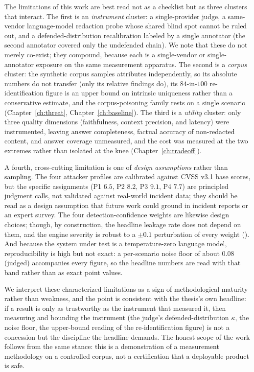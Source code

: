 \documentclass[12pt,a4paper]{report}
\begin{document}
The limitations of this work are best read not as a checklist but as three clusters that
interact. The first is an \emph{instrument} cluster: a single-provider judge, a same-vendor
language-model redaction probe whose shared blind spot cannot be ruled out, and a
defended-distribution recalibration labeled by a single annotator (the second annotator
covered only the undefended chain). We note that these do
not merely co-exist; they compound, because each is a single-vendor or single-annotator exposure
on the same measurement apparatus. The second is a \emph{corpus} cluster: the synthetic corpus
samples attributes independently, so its absolute numbers do not transfer (only its relative
findings do), its $84$-in-$100$ re-identification figure is an upper bound on intrinsic
uniqueness rather than a conservative estimate, and the corpus-poisoning family rests on a single
scenario (Chapter~\ref{ch:threat}, Chapter~\ref{ch:baseline}). The third is a \emph{utility}
cluster: only three quality dimensions (faithfulness, context precision, and latency) were
instrumented, leaving answer completeness, factual accuracy of non-redacted content, and answer
coverage unmeasured, and the cost was measured at the two extremes rather than isolated at the knee
(Chapter~\ref{ch:tradeoff}).

A fourth, cross-cutting limitation is one of \emph{design assumptions} rather than sampling. The four
attacker profiles are calibrated against CVSS v3.1 base scores, but the specific assignments (P1
$6.5$, P2 $8.2$, P3 $9.1$, P4 $7.7$) are principled judgment calls, not validated against real-world
incident data; they should be read as a design assumption that future work could ground in incident
reports or an expert survey. The four detection-confidence weights are likewise design choices;
though, by construction, the headline leakage rate does not depend on them, and the engine severity is
robust to a $\pm 0.1$ perturbation of every weight (). And because
the system under test is a temperature-zero language model, reproducibility is high but not exact: a
per-scenario noise floor of about $0.08$ (judged) accompanies every figure, so the headline numbers
are read with that band rather than as exact point values.

We interpret these characterized limitations as a sign of methodological maturity rather than
weakness, and the point is consistent with the thesis's own headline: if a result is
only as trustworthy as the instrument that measured it, then measuring and bounding the
instrument (the judge's defended-distribution $\kappa$, the noise floor, the upper-bound
reading of the re-identification figure) is not a concession but the discipline the headline
demands. The honest scope of the work follows from the same stance: this is a demonstration of a
measurement methodology on a controlled corpus, not a certification that a deployable product is
safe.
\end{document}
